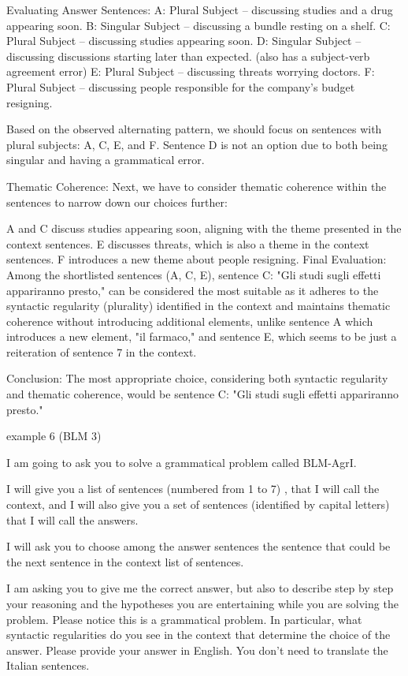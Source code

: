 Evaluating Answer Sentences:
A: Plural Subject – discussing studies and a drug appearing soon.
B: Singular Subject – discussing a bundle resting on a shelf.
C: Plural Subject – discussing studies appearing soon.
D: Singular Subject – discussing discussions starting later than expected. (also has a subject-verb agreement error)
E: Plural Subject – discussing threats worrying doctors.
F: Plural Subject – discussing people responsible for the company’s budget resigning.

Based on the observed alternating pattern, we should focus on sentences with plural subjects: A, C, E, and F. Sentence D is not an option due to both being singular and having a grammatical error.

Thematic Coherence:
Next, we have to consider thematic coherence within the sentences to narrow down our choices further:

A and C discuss studies appearing soon, aligning with the theme presented in the context sentences.
E discusses threats, which is also a theme in the context sentences.
F introduces a new theme about people resigning.
Final Evaluation:
Among the shortlisted sentences (A, C, E), sentence C: "Gli studi sugli effetti appariranno presto," can be considered the most suitable as it adheres to the syntactic regularity (plurality) identified in the context and maintains thematic coherence without introducing additional elements, unlike sentence A which introduces a new element, "il farmaco," and sentence E, which seems to be just a reiteration of sentence 7 in the context.

Conclusion:
The most appropriate choice, considering both syntactic regularity and thematic coherence, would be sentence C: "Gli studi sugli effetti appariranno presto."

example 6 (BLM 3)

I am going to ask you to solve a grammatical problem called BLM-AgrI.  

I will give you a list of sentences (numbered from 1 to 7) , that I will call the context, and I will also give you a set of sentences (identified by capital letters) that I will call  the answers. 

I will ask you to choose among the answer sentences the sentence that could be the next sentence in the context list of sentences.

I am asking you to give me the correct answer, but also to describe step by step  your reasoning and the hypotheses you are entertaining while you are solving the problem. Please notice this is a grammatical problem. In particular, what syntactic regularities do you see in the context that determine the choice of the answer.
Please provide your answer in English. You don't need to translate the Italian sentences.



